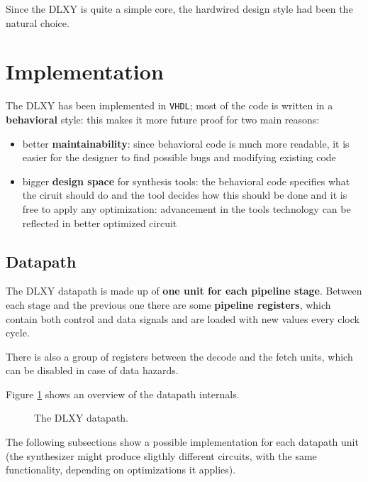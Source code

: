 \bigskip
Since the DLXY is quite a simple core, the hardwired design style had been the
natural choice.

\section{Implementation}
The DLXY has been implemented in \texttt{VHDL}; most of the code is written in a
\textbf{behavioral} style: this makes it more future proof for two main reasons:
\begin{itemize}
	\item better \textbf{maintainability}: since behavioral code is much
		more readable, it is easier for the designer to find possible
		bugs and modifying existing code
	\item bigger \textbf{design space} for synthesis tools: the behavioral
		code specifies what the ciruit should do and the tool decides
		how this should be done and it is free to apply any optimization:
		advancement in the tools technology can be reflected in better
		optimized circuit
\end{itemize}

\subsection{Datapath}
The DLXY datapath is made up of \textbf{one unit for each pipeline stage}.
Between each stage and the previous one there are some \textbf{pipeline registers},
which contain both control and data signals and are loaded with new values every
clock cycle.

There is also a group of registers between the decode and the fetch units, which
can be disabled in case of data hazards.

\bigskip
Figure \ref{fig:datapath} shows an overview of the datapath internals.

\begin{figure}[H]
	\centering
	\caption{The DLXY datapath.}
	\label{fig:datapath}
\end{figure}

\bigskip
The following subsections show a possible implementation for each datapath unit
(the synthesizer might produce sligthly different circuits, with the same
functionality, depending on optimizations it applies).

